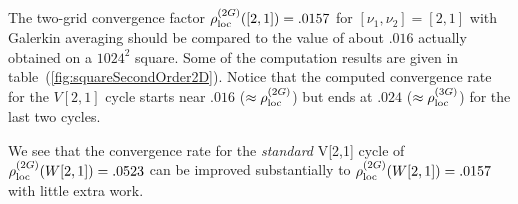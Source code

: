 
The two-grid convergence factor $\rho_{\rm loc}^{(2G)}([2,1]) =  .0157$
for $[\nu_1,\nu_2]=[2,1]$ with  Galerkin averaging 
should be compared to the value of about $.016$ actually obtained on a $1024^2$ square.
Some of the computation results are given in table~(\ref{fig:squareSecondOrder2D}).
Notice that the computed convergence rate for the $V[2,1]$ cycle starts near $.016$ ($\approx \rho_{\rm loc}^{(2G)}$)
but ends at $.024$ ($\approx \rho_{\rm loc}^{(3G)}$) for the last two cycles. 

We see that the convergence rate for the {\em standard} V[2,1] cycle
of $\rho_{\rm loc}^{(2G)}(W[2,1]) = .0523$ can be improved substantially to 
$\rho_{\rm loc}^{(2G)}(W[2,1])= .0157$ with little extra work.

